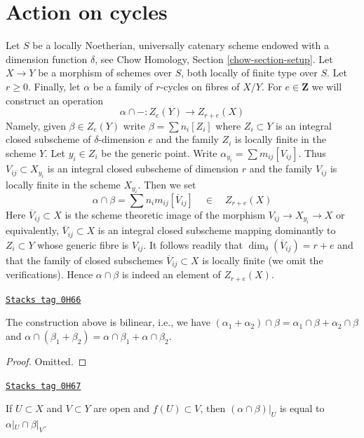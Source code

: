 \section{Action on cycles}
\label{relative-cycles-section-action}
Let $S$ be a locally Noetherian, universally catenary scheme endowed
with a dimension function $\delta$, see
Chow Homology, Section \ref{chow-section-setup}.
Let $X \to Y$ be a morphism of schemes over $S$, both locally of finite
type over $S$. Let $r \geq 0$. Finally, let $\alpha$ be a family of
$r$-cycles on fibres of $X/Y$. For $e \in \mathbf{Z}$
we will construct an operation
$$
\alpha \cap - : Z_e(Y) \longrightarrow Z_{r + e}(X)
$$
Namely, given $\beta \in Z_e(Y)$ write $\beta = \sum n_i[Z_i]$
where $Z_i \subset Y$ is an integral closed subscheme of
$\delta$-dimension $e$ and the
family $Z_i$ is locally finite in the scheme $Y$.
Let $y_i \in Z_i$ be the generic point. Write
$\alpha_{y_i} = \sum m_{ij} [V_{ij}]$. Thus $V_{ij} \subset X_{y_i}$
is an integral closed subscheme of dimension $r$ and the family
$V_{ij}$ is locally finite in the scheme $X_{y_i}$.
Then we set
$$
\alpha \cap \beta = \sum n_i m_{ij} [\overline{V}_{ij}]
\quad\in\quad
Z_{r + e}(X)
$$
Here $\overline{V}_{ij} \subset X$ is the scheme theoretic image
of the morphism $V_{ij} \to X_{y_i} \to X$ or equivalently,
$\overline{V}_{ij} \subset X$ is an integral closed subscheme
mapping dominantly to $Z_i \subset Y$ whose generic fibre is $V_{ij}$.
It follows readily that $\dim_\delta(\overline{V}_{ij}) = r + e$
and that the family of closed subschemes
$\overline{V}_{ij} \subset X$ is locally finite (we omit the verifications).
Hence $\alpha \cap \beta$ is indeed an element of $Z_{r + e}(X)$.

\begin{lemma}
\label{relative-cycles-lemma-action-bilinear}
\href{https://stacks.math.columbia.edu/tag/0H66}{\texttt{Stacks tag 0H66}}

The construction above is bilinear, i.e., we have
$(\alpha_1 + \alpha_2) \cap \beta = \alpha_1 \cap \beta +
\alpha_2 \cap \beta$ and $\alpha \cap (\beta_1 + \beta_2) =
\alpha \cap \beta_1 + \alpha \cap \beta_2$.
\end{lemma}

\begin{proof}
Omitted.
\end{proof}

\begin{lemma}
\label{relative-cycles-lemma-action-opens}
\href{https://stacks.math.columbia.edu/tag/0H67}{\texttt{Stacks tag 0H67}}

If $U \subset X$ and $V \subset Y$ are open and $f(U) \subset V$, then
$(\alpha \cap \beta)|_U$ is equal to $\alpha|_U \cap \beta|_V$.
\end{lemma}


